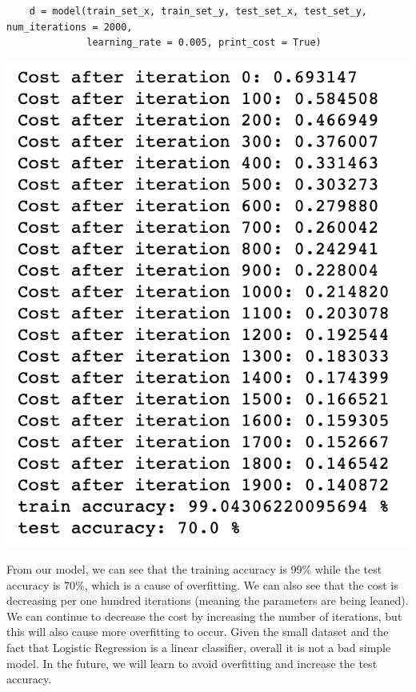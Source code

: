 \documentclass[11pt, a4paper]{article}
\begin{document}
\begin{spacing}{1.1}
\begin{lstlisting}
	d = model(train_set_x, train_set_y, test_set_x, test_set_y, num_iterations = 2000, 
	          learning_rate = 0.005, print_cost = True) \end{lstlisting} \vspace*{1mm}
	\begin{minipage}[c]{6cm}
	\includegraphics[scale=0.4]{model_output}
	\end{minipage}
	\begin{minipage}[c]{11cm}
	From our model, we can see that the training accuracy is 99\% while the test accuracy is 70\%, which is a cause of overfitting. We can also see that the cost is decreasing per one hundred iterations (meaning the parameters are being leaned). We can continue to decrease the cost by increasing the number of iterations, but this will also cause more overfitting to occur. Given the small dataset and the fact that Logistic Regression is a linear classifier, overall it is not a bad simple model. In the future, we will learn to avoid overfitting and increase the test accuracy.
	\end{minipage} \newpage


\end{spacing}
\end{document}
